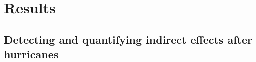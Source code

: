 \documentclass[11pt]{article}
\begin{document}


\section{Results}
\label{sec:results}

\subsection{Detecting and quantifying indirect effects after hurricanes}
\label{subsec:effects}
\end{document}
